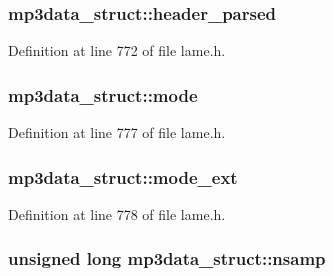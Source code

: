 \subsubsection[{\texorpdfstring{header\+\_\+parsed}{header_parsed}}]{ mp3data\+\_\+struct\+::header\+\_\+parsed}\hypertarget{structmp3data__struct_ab5a8987eae86e58b60d6e2d8669d1bdc}{}\label{structmp3data__struct_ab5a8987eae86e58b60d6e2d8669d1bdc}


Definition at line 772 of file lame.\+h.

\subsubsection[{\texorpdfstring{mode}{mode}}]{ mp3data\+\_\+struct\+::mode}\hypertarget{structmp3data__struct_aebadc1b792213403a8f18f2fe386d633}{}\label{structmp3data__struct_aebadc1b792213403a8f18f2fe386d633}


Definition at line 777 of file lame.\+h.

\subsubsection[{\texorpdfstring{mode\+\_\+ext}{mode_ext}}]{ mp3data\+\_\+struct\+::mode\+\_\+ext}\hypertarget{structmp3data__struct_a7cfd50e454b886ee5426ddc6b684d7da}{}\label{structmp3data__struct_a7cfd50e454b886ee5426ddc6b684d7da}


Definition at line 778 of file lame.\+h.

\subsubsection[{\texorpdfstring{nsamp}{nsamp}}]{\setlength{\rightskip}{0pt plus 5cm}unsigned long mp3data\+\_\+struct\+::nsamp}\hypertarget{structmp3data__struct_a5353f369d023b277619e5c05c432f015}{}\label{structmp3data__struct_a5353f369d023b277619e5c05c432f015}


